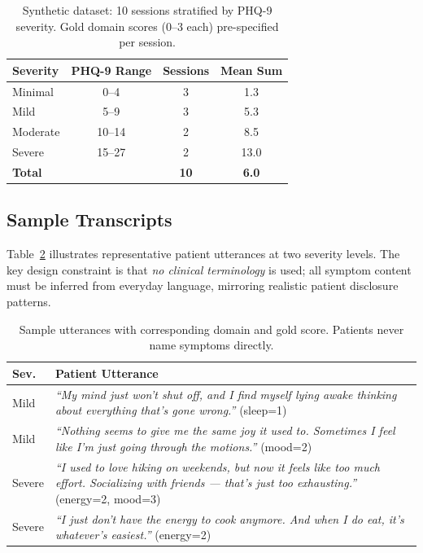 \documentclass[11pt,twocolumn]{article}
\begin{document}
\begin{table}[h]
\centering\small
\begin{tabular}{lccc}
\toprule
\textbf{Severity} & \textbf{PHQ-9 Range} & \textbf{Sessions} & \textbf{Mean Sum} \\
\midrule
Minimal  & 0--4   & 3 & 1.3 \\
Mild     & 5--9   & 3 & 5.3 \\
Moderate & 10--14 & 2 & 8.5 \\
Severe   & 15--27 & 2 & 13.0 \\
\midrule
\textbf{Total} & & \textbf{10} & \textbf{6.0} \\
\bottomrule
\end{tabular}
\caption{Synthetic dataset: 10 sessions stratified by PHQ-9 severity. Gold domain scores (0--3 each) pre-specified per session.}
\label{tab:dataset}
\end{table}

\subsection{Sample Transcripts}

Table~\ref{tab:transcripts} illustrates representative patient utterances at two severity levels. The key design constraint is that \emph{no clinical terminology} is used; all symptom content must be inferred from everyday language, mirroring realistic patient disclosure patterns.

\begin{table}[h]
\centering\small
\setlength{\tabcolsep}{4pt}
\begin{tabular}{p{0.65cm}p{6.0cm}}
\toprule
\textbf{Sev.} & \textbf{Patient Utterance} \\
\midrule
Mild & \textit{``My mind just won't shut off, and I find myself lying awake thinking about everything that's gone wrong.''} (sleep=1) \\[4pt]
Mild & \textit{``Nothing seems to give me the same joy it used to. Sometimes I feel like I'm just going through the motions.''} (mood=2) \\[4pt]
Severe & \textit{``I used to love hiking on weekends, but now it feels like too much effort. Socializing with friends — that's just too exhausting.''} (energy=2, mood=3) \\[4pt]
Severe & \textit{``I just don't have the energy to cook anymore. And when I do eat, it's whatever's easiest.''} (energy=2) \\
\bottomrule
\end{tabular}
\caption{Sample utterances with corresponding domain and gold score. Patients never name symptoms directly.}
\label{tab:transcripts}
\end{table}
\end{document}
